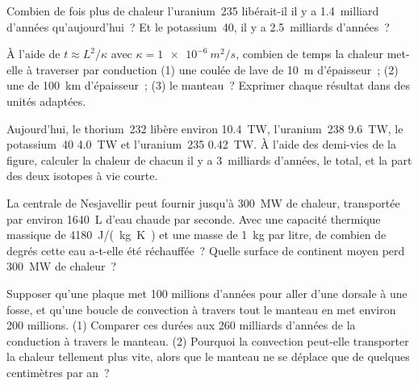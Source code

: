 \begin{exercise}[$\star\star$]\label{exo:g12:internal-heat:10}
Combien de fois plus de chaleur l'uranium~235 libérait-il il y a
1.4~milliard d'années qu'aujourd'hui~? Et le potassium~40, il y a
2.5~milliards d'années~?
\end{exercise}

\begin{exercise}[$\star\star$]\label{exo:g12:internal-heat:11}
À l'aide de $t \approx L^2/\kappa$ avec $\kappa = \qty{1e-6}{m^2/s}$,
combien de temps la chaleur met-elle à traverser par conduction (1) une
coulée de lave de \qty{10}{m} d'épaisseur~; (2) une  de
\qty{100}{km} d'épaisseur~; (3) le manteau~? Exprimer chaque résultat dans
des unités adaptées.
\end{exercise}

\begin{exercise}[$\star\star\star$]\label{exo:g12:internal-heat:12}
Aujourd'hui, le thorium~232 libère environ \qty{10.4}{TW}, l'uranium~238
\qty{9.6}{TW}, le potassium~40 \qty{4.0}{TW} et l'uranium~235
\qty{0.42}{TW}. À l'aide des demi-vies de la figure, calculer la chaleur
de chacun il y a 3~milliards d'années, le total, et la part des deux
isotopes à vie courte.
\end{exercise}

\begin{exercise}[$\star\star\star$]\label{exo:g12:internal-heat:13}
La centrale de Nesjavellir peut fournir jusqu'à \qty{300}{MW} de chaleur,
transportée par environ \qty{1640}{L} d'eau chaude par seconde. Avec une
capacité thermique massique de \qty{4180}{J/(kg.K)} et une masse de
\qty{1}{kg} par litre, de combien de degrés cette eau a-t-elle été
réchauffée~? Quelle surface de continent moyen perd \qty{300}{MW} de
chaleur~?
\end{exercise}

\begin{exercise}[$\star\star\star$]\label{exo:g12:internal-heat:14}
Supposer qu'une plaque met 100 millions d'années pour aller d'une dorsale
à une fosse, et qu'une boucle de convection à travers tout le manteau en
met environ 200 millions. (1) Comparer ces durées aux 260 milliards
d'années de la conduction à travers le manteau. (2) Pourquoi la convection
peut-elle transporter la chaleur tellement plus vite, alors que le manteau
ne se déplace que de quelques centimètres par an~?
\end{exercise}

